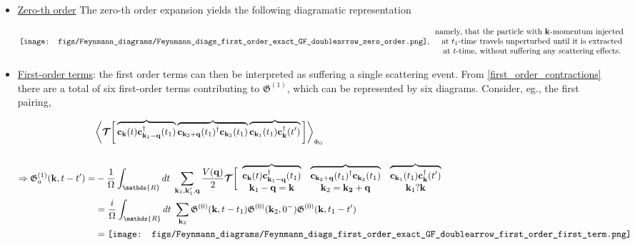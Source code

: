 \begin{itemize}
    \item \underline{Zero-th order} The zero-th order expansion yields the following diagramatic representation

    \begin{equation}
        \texttt{[image: figs/Feynmann\_diagrams/Feynmann\_diags\_first\_order\_exact\_GF\_doublearrow\_zero\_order.png]}, \begin{array}{cc}
             \textnormal{namely, that the particle with ${\bf k}$-momentum injected } \\
             \textnormal{ at $t_1$-time travels unperturbed until it is extracted}\\
             \textnormal{ at $t$-time, without suffering any scattering effects.} 
        \end{array}
    \end{equation}

\item \underline{First-order terms}: the first order terms can then be 
interpreted as suffering a single scattering event. From \cref{first_order_contractions} there are a total of six first-order terms contributing to $\mathfrak{G}^{(1)}$, which can be represented by six diagrams. Consider, eg., the first pairing, 

\begin{equation}
\begin{split}
    &\bigg \langle \bm{\mathcal{T}} \bigg[ 
    \overbrace{
    {\bf c}_{{\bf k}}(t) {\bf c}_{{\bf k}_1 - {\bf q}}^\dagger(t_1)
    } \overbrace{
    {\bf c}_{{\bf k}_2 + {\bf q}}(t_1)^\dagger {\bf c}_{{\bf k}_2}(t_1) 
    } \overbrace{
    {\bf c}_{{\bf k}_1}(t_1) {\bf c}_{{\bf k}}^\dagger(t')
    }
    \bigg]\bigg \rangle_{{\Phi_0}}\\
    \\
    \Rightarrow \mathfrak{G}_{a}^{(1)} ({\bf k}, t-t') =& -\frac{1}{\Omega} \int_{\mathds{R}} dt \blanky \sum_{{\bf k}_1, {\bf k}'_1, {\bf q}} \frac{V({\bf q)}}{2} \bm{\mathcal{T}} \bigg[ \begin{array}{ccc}
         \overbrace{
    {\bf c}_{{\bf k}}(t) {\bf c}_{{\bf k}_1 - {\bf q}}^\dagger(t_1)
    } & \overbrace{
    {\bf c}_{{\bf k}_2 + {\bf q}}(t_1)^\dagger {\bf c}_{{\bf k}_2}(t_1) 
    } & \overbrace{
    {\bf c}_{{\bf k}_1}(t_1) {\bf c}_{{\bf k}}^\dagger(t')
    } \\
    {\bf k}_1 - {\bf q} = {\bf k} & {\bf k}_2 = {\bf k_2} + {\bf q} & {\bf k}_1 ? {\bf k}
    \end{array} \\
    &= \frac{i}{\Omega} \int_{\mathds{R}} dt \blanky \sum_{{\bf k}_2} \mathfrak{G}^{(0)}({\bf k}, t- t_1)  \mathfrak{G}^{(0)}({\bf k}_2, 0^-)  \mathfrak{G}^{(0)}({\bf k}, t_1 - t') \\
    &= \texttt{[image: figs/Feynmann\_diagrams/Feynmann\_diags\_first\_order\_exact\_GF\_doublearrow\_first\_order\_first\_term.png]}
\end{split}
\end{equation}


\end{itemize}
